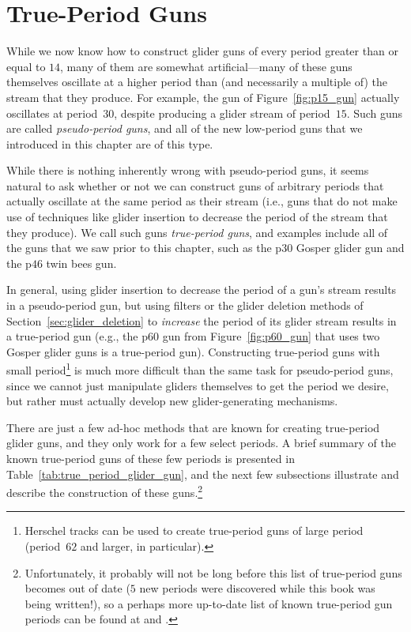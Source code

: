 \section{True-Period Guns}\label{sec:true_period_guns}

While we now know how to construct glider guns of every period greater than or equal to $14$, many of them are somewhat artificial---many of these guns themselves oscillate at a higher period than (and necessarily a multiple of) the stream that they produce. For example, the gun of Figure~\ref{fig:p15_gun} actually oscillates at period~$30$, despite producing a glider stream of period~$15$. Such guns are called \emph{pseudo-period guns}, and all of the new low-period guns that we introduced in this chapter are of this type.

While there is nothing inherently wrong with pseudo-period guns, it seems natural to ask whether or not we can construct guns of arbitrary periods that actually oscillate at the same period as their stream (i.e., guns that do not make use of techniques like glider insertion to decrease the period of the stream that they produce). We call such guns \emph{true-period guns}, and examples include all of the guns that we saw prior to this chapter, such as the p$30$ Gosper glider gun and the p$46$ twin bees gun.

In general, using glider insertion to decrease the period of a gun's stream results in a pseudo-period gun, but using filters or the glider deletion methods of Section~\ref{sec:glider_deletion} to \emph{increase} the period of its glider stream results in a true-period gun (e.g., the p$60$ gun from Figure~\ref{fig:p60_gun} that uses two Gosper glider guns is a true-period gun). Constructing true-period guns with small period\footnote{Herschel tracks can be used to create true-period guns of large period (period~$62$ and larger, in particular).} is much more difficult than the same task for pseudo-period guns, since we cannot just manipulate gliders themselves to get the period we desire, but rather must actually develop new glider-generating mechanisms.

There are just a few ad-hoc methods that are known for creating true-period glider guns, and they only work for a few select periods. A brief summary of the known true-period guns of these few periods is presented in Table~\ref{tab:true_period_glider_gun}, and the next few subsections illustrate and describe the construction of these guns.\footnote{Unfortunately, it probably will not be long before this list of true-period guns becomes out of date ($5$ new periods were discovered while this book was being written!), so a perhaps more up-to-date list of known true-period gun periods can be found at  and .}

